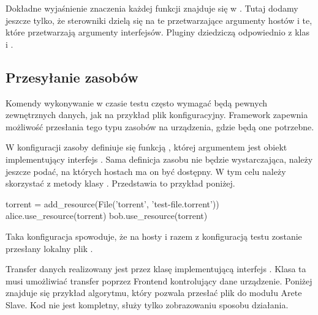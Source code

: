 \documentclass[00-praca-magisterska.tex]{subfiles}
\begin{document}
Dokładne wyjaśnienie znaczenia każdej funkcji znajduje się w . Tutaj dodamy jeszcze tylko, że sterowniki dzielą się na te
przetwarzające argumenty hostów i te, które przetwarzają argumenty interfejsów.
Pluginy dziedziczą odpowiednio z klas  i
.

\subsection{Przesyłanie zasobów}

Komendy wykonywanie w czasie testu często wymagać będą pewnych zewnętrznych
danych, jak na przykład plik konfiguracyjny. Framework zapewnia możliwość
przesłania tego typu zasobów na urządzenia, gdzie będą one potrzebne.

W konfiguracji zasoby definiuje się funkcją , której
argumentem jest obiekt implementujący interfejs . Sama definicja
zasobu nie będzie wystarczająca, należy jeszcze podać, na których hostach ma on
być dostępny. W tym celu należy skorzystać z metody  klasy
. Przedstawia to przykład poniżej.

\begin{pythoncode}
  torrent = add_resource(File('torrent', 'test-file.torrent'))
  alice.use_resource(torrent)
  bob.use_resource(torrent)
\end{pythoncode}

Taka konfiguracja spowoduje, że na hosty  i  razem z
konfiguracją testu zostanie przesłany lokalny plik .

Transfer danych realizowany jest przez klasę implementującą interfejs
. Klasa ta musi umożliwiać transfer poprzez Frontend kontrolujący
dane urządzenie. Poniżej znajduje się przykład algorytmu, który pozwala przesłać
plik do modułu Arete Slave. Kod nie jest kompletny, służy tylko zobrazowaniu
sposobu działania.

\end{document}
